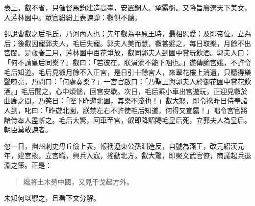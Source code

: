 表上，叡不省，只催督馬鈞建造高臺，安置銅人、承露盤。又降旨廣選天下美女，入芳林園中。眾官紛紛上表諫諍：叡俱不聽。

卻說曹叡之后毛氏，乃河內人也；先年叡為平原王時，最相恩愛；及即帝位，立為后；後叡因寵郭夫人，毛后失寵。郭夫人美而慧，叡甚嬖之，每日取樂，月餘不出宮闥。是歲春三月，芳林園中百花爭放，叡同郭夫人到園中賞玩飲酒。郭夫人曰：「何不請皇后同樂？」叡曰：「若彼在，朕涓滴不能下咽也。」遂傳諭宮娥，不許令毛后知道。毛后見叡月餘不入正宮，是日引十餘宮人，來翠花樓上消遺，只聽得樂聲嘹亮，乃問曰：「何處奏樂？」一宮官啟曰：「乃聖上與郭夫人於御花園中賞花飲酒。」毛后聞之，心中煩惱，回宮安歇。次日，毛后乘小車出宮遊玩，正迎見叡於曲廊之間，乃笑日：「陛下昨遊北園，其樂不淺也！」叡大怒，即令擒昨日侍奉諸人到，叱曰：「昨遊北園，朕禁左右不許使毛后知道，何得又宣露！」喝令宮官將諸侍奉人盡斬之。毛后大驚，回車至宮，叡即降詔賜毛皇后死，立郭夫人為皇后。朝臣莫敢諫者。

忽一日，幽州刺史毋丘儉上表，報稱遼東公孫淵造反，自號為燕王，改元紹漢元年，建宮殿，立宮職，興兵入寇，搖動北方。叡大驚，即聚文武官僚，商議起兵退淵之策。正是：

\begin{quote}
纔將土木勞中國，又見干戈起方外。
\end{quote}

未知何以禦之，且看下文分解。

